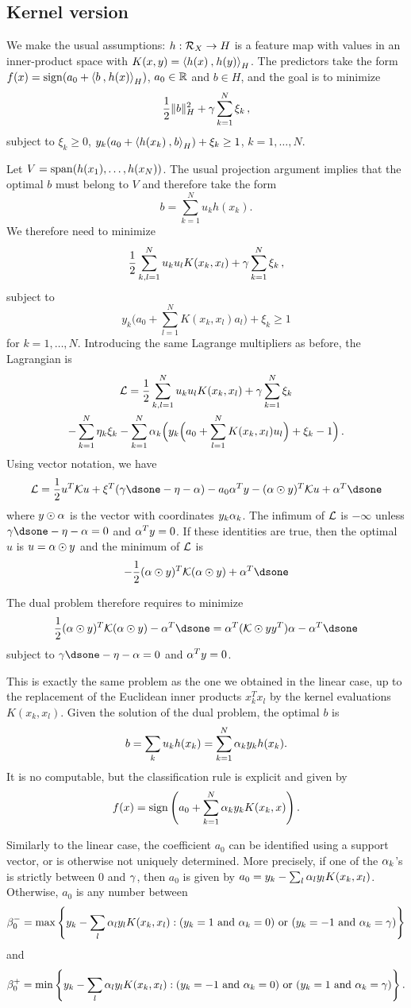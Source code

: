 \subsection{Kernel version}
We make the usual assumptions: $h : {\mathcal R}_X \to H$ is a feature map with values in an inner-product space with $K(x,y) = {\langle {h(x)}\mathbin{,} {h(y)}\rangle}_H$.  The predictors take the form $f(x) = \mathrm{sign}({a_0} + {\langle {b}\mathbin{,} {h(x)}\rangle}_H)$, ${a_0}\in {\mathbb{R}}$ and $b\in H$,
and the goal is to minimize
\[
\frac{1}{2} \|b\|_H^2 + \gamma \sum_{k=1}^N \xi_k\,,
\]
subject to $\xi_k \geq 0$, $y_k({a_0} + {\langle {h(x_k)}\mathbin{,} {b}\rangle}_H) + \xi_k \geq 1$, $k=1, \ldots, N$.

 Let $V = \mathrm{span}(h(x_1), \ldots, h(x_N))$. The usual projection argument implies that the optimal $b$ must belong to $V$ and therefore take the form
\[
b = \sum_{k=1}^N u_k h(x_k).
\]
We therefore need to minimize
\[
\frac{1}{2} \sum_{k,l=1}^N u_ku_l K(x_k, x_l) + \gamma \sum_{k=1}^N \xi_k\,,
\]
subject to
\[
y_k\Big({a_0} + \sum_{l=1}^N K(x_k, x_l) a_l \Big)+ \xi_k
\geq 1
\]
for $k=1, \ldots, N$. Introducing the same Lagrange multipliers as before, the Lagrangian is 
\begin{multline*}
{\mathcal L} = \frac{1}{2} \sum_{k,l=1}^N u_ku_l K(x_k, x_l) + \gamma \sum_{k=1}^N \xi_k \\
- \sum_{k=1}^N
\eta_k\xi_k -  \sum_{k=1}^N \alpha_k \Big(y_k\Big({a_0} + \sum_{l=1}^N K(x_k, x_l) u_l\Big) +\xi_k - 1\Big)\,.
\end{multline*}
 Using vector notation, we have
\[
\CL = \frac12 u^T \CK u + \xi^T (\ga \dsone - \eta - \al) - {a_0} \al^T y - (\al\odot y)^T\CK u  + \al^T\dsone
\]
where $y\odot\alpha$ is the vector with coordinates $y_k\alpha_k$.
 The infimum of ${\mathcal L}$ is $-\infty$ unless $\ga \dsone - \eta - \al=0$ and $\alpha^T y=0$.
 If these identities are true, then the optimal $u$ is $u = \alpha\odot y$ and the minimum of ${\mathcal L}$ is
\[
- \frac12 (\al\odot y)^T\CK (\al\odot y)  + \al^T\dsone
\]

The dual problem therefore requires to minimize
\[
\frac12 (\al\odot y)^T\CK (\al\odot y)  - \al^T\dsone = \al^T(\CK\odot yy^T) \al  - \al^T\dsone
\]
subject to $\ga \dsone - \eta - \al=0$ and $\alpha^T y=0$.
\medskip

This is exactly the same problem as the one we obtained in the linear case, up to the replacement of the Euclidean inner products $x_k^Tx_l$ by the kernel evaluations $K(x_k, x_l)$. 
Given the solution of the dual problem, the optimal $b$ is 
\[
b=\sum_{k} u_k h(x_k) = \sum_{k=1}^N \alpha_k y_k h(x_k).
\]
It is no computable, but the classification rule is explicit and given by
\[
f(x) = \operatorname{sign}\left({a_0} + \sum_{k=1}^N \alpha_k y_k K(x_k,x)\right).
\]

Similarly to the linear case, the coefficient ${a_0}$ can be identified using a support vector, or is otherwise not uniquely determined. More precisely,  if one of the $\alpha_k$'s is strictly between $0$ and $\gamma$, then ${a_0}$ is given by ${a_0} = y_k - \sum_l \alpha_l y_l K(x_k,x_l)$. Otherwise, ${a_0}$ is any number between 
\[
\beta^-_{0} =
\max\left\{  y_k- \sum_l \alpha_l y_l K(x_k,x_l): (y_k=1 \text{ and } \alpha_k=0) \text{ or } (y_k=-1 \text{ and } \alpha_k=\gamma) \right\}  
\]
and 
\[
\beta^+_{0} = \min\left\{  y_k- \sum_l \alpha_l y_l K(x_k,x_l):  (y_k=-1 \text{ and } \alpha_k=0)
 \text{ or } (y_k=1 \text{ and } \alpha_k=\gamma) \right\}.
\]
